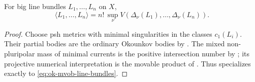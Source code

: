 \begin{theorem}\label{thm:ok-mvob-line-bundles}
For big line bundles \(L_1,\ldots,L_n\) on \(X\),
\[
 \langle L_1,\dots,L_n\rangle
 =n!\,\sup_\nu V\!\left(
     \Delta_\nu(L_1),\dots,\Delta_\nu(L_n)\right).
\tag{55.49}\label{eq:ok-mvob-line-bundles}
\]
\end{theorem}

\begin{proof}
Choose psh metrics with minimal singularities in the classes \(c_1(L_i)\).
Their partial bodies are the ordinary Okounkov bodies by
.  The mixed non-pluripolar mass of
minimal currents is the positive intersection number by
\cite[Definition~1.17]{BEGZ10}; its projective numerical interpretation is
the movable product of \cite[Propositions~2.12--2.13]{BFJ09}.
Thus  specializes exactly to
\eqref{eq:ok-mvob-line-bundles}.
\end{proof}
